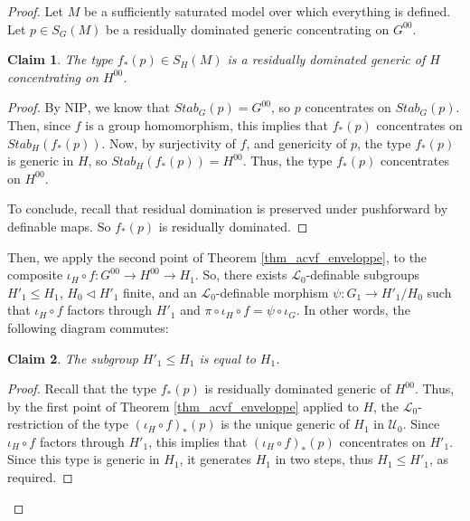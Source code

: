 \documentclass[12pt]{article}
\newcommand{\NIP}{\mathrm{NIP}}
\newcommand{\0}{\emptyset}
\newcommand{\Ualg}{\mathcal{U}_0}
\theoremstyle{plain}%
\newtheorem{claim}{Claim}
\theoremstyle{definition}
\theoremstyle{remark}
\begin{document}
\begin{proof}
\setcounter{claim}{0}
    Let $M$ be a sufficiently saturated model over which everything is defined. Let $p \in S_G(M)$ be a residually dominated generic concentrating on $G^{00}$.
    \begin{claim}
        The type $f_*(p) \in S_H(M)$ is a residually dominated generic of $H$ concentrating on $H^{00}$.
    \end{claim}
    \begin{proof}
        By $\NIP$, we know that $Stab_G(p)=G^{00}$, so $p$ concentrates on $Stab_G(p)$. Then, since $f$ is a group homomorphism, this implies that $f_*(p)$ concentrates on $Stab_H(f_*(p))$. Now, by surjectivity of $f$, and genericity of $p$, the type $f_*(p)$ is generic in $H$, so $Stab_H(f_*(p))=H^{00}$. Thus, the type $f_*(p)$ concentrates on $H^{00}$.

        To conclude, recall that residual domination is preserved under pushforward by definable maps. So $f_*(p)$ is residually dominated.
    \end{proof}

    Then, we apply the second point of Theorem \ref{thm_acvf_enveloppe}, to the composite $\iota_H \circ f: G^{00} \rightarrow H^{00} \rightarrow H_1$. So, there exists $\mathcal{L}_0$-definable subgroups $H'_1 \leq H_1$, $H_0 \lhd H'_1$ finite, and an $\mathcal{L}_0$-definable morphism $\psi: G_1 \rightarrow H'_1/H_0$ such that $\iota_H \circ f$ factors through $H'_1$ and $\pi \circ \iota_H \circ f = \psi \circ \iota_G$. In other words, the following diagram commutes:

    
\begin{center}
\end{center}

\begin{claim}
    The subgroup $H'_1 \leq H_1$ is equal to $H_1$.
\end{claim}
\begin{proof}
    Recall that the type $f_*(p)$ is residually dominated generic of $H^{00}$. Thus, by the first point of Theorem \ref{thm_acvf_enveloppe} applied to $H$, the $\mathcal{L}_0$-restriction of the type ${(\iota_H \circ f)}_*(p)$ is the unique generic of $H_1$ in $\Ualg$. Since $\iota_H \circ f$ factors through $H'_1$, this implies that ${(\iota_H \circ f)}_*(p)$ concentrates on $H'_1$. Since this type is generic in $H_1$, it generates $H_1$ in two steps, thus $H_1 \leq H'_1$, as required.
\end{proof}


\end{proof}
\end{document}
